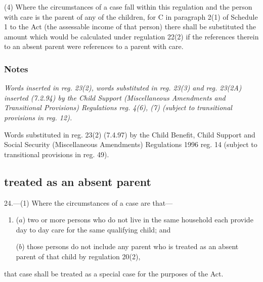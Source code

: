 \documentclass[a4paper]{article}
\newcommand\amendment[1]{\subsubsection*{Notes}{\itshape\frenchspacing\footnotesize #1 \par\goodbreak}}
\begin{document}
(4) Where the circumstances of a case fall within this regulation and the person with care is the parent of any of the children, for C in paragraph 2(1) of Schedule 1 to the Act (the assessable income of that person) there shall be substituted the amount which would be calculated under regulation 22(2) if the references therein to an absent parent were references to a parent with care.

\amendment{Words inserted in reg. 23(2), words substituted in reg. 23(3) and reg. 23(2A) inserted (7.2.94) by the Child Support (Miscellaneous Amendments and Transitional Provisions) Regulations reg. 4(6), (7) (subject to transitional provisions in reg. 12).

Words substituted in reg. 23(2) (7.4.97) by the Child Benefit, Child Support and Social Security (Miscellaneous Amendments) Regulations 1996 reg. 14 (subject to transitional provisions in reg. 49).
}

\subsection[24. Persons with part-time care—not including a person treated as an absent parent]{\sloppy {} treated as an absent parent}

24.—(1) Where the circumstances of a case are that—
\begin{enumerate}\item[]
($a$) two or more persons who do not live in the same household each provide day to day care for the same qualifying child; and

($b$) those persons do not include any parent who is treated as an absent parent of that child by regulation 20(2),
\end{enumerate}
that case shall be treated as a special case for the purposes of the Act.
\end{document}
